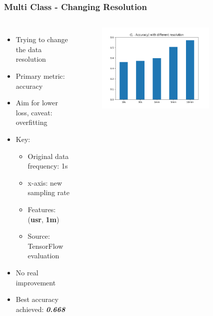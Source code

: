 \documentclass[aspectratio=169,11pt,hyperref={colorlinks=true}]{beamer}
\begin{document}
\begin{frame}
    \frametitle{Multi Class - Changing Resolution}
    \begin{columns}
        \begin{itemize}
            \item{Trying to change the data resolution}
            \item{Primary metric: accuracy}
            \item{Aim for lower loss, caveat: overfitting}
            \item{Key:}
            \begin{itemize}
              \item{Original data frequency: 1s}
              \item{x-axis: new sampling rate}
              \item{Features: (\textbf{usr}, \textbf{1m})}
              \item{Source: TensorFlow evaluation}
            \end{itemize}
            \item{No real improvement}
            \item{Best accuracy achieved: \emph{\textbf{0.668}}}
        \end{itemize}
        \begin{center}
        \begin{figure}
          \includegraphics[width=0.8\textwidth,height=0.4\textheight]{graphs/accuracy_by_sampling-node_provider_all.png}
        \end{figure}
        \begin{figure}

\end{figure}
\end{center}
\end{columns}
\end{frame}
\end{document}
